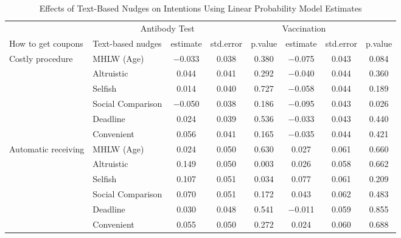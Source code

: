 \begin{table}

\caption{Effects of Text-Based Nudges on Intentions Using Linear Probability Model Estimates \label{tab:int-reg-ftest}}
\centering
\begin{tabular}[t]{>{\raggedright\arraybackslash}p{5em}lcccccc}
\toprule
\multicolumn{2}{c}{ } & \multicolumn{3}{c}{Antibody Test} & \multicolumn{3}{c}{Vaccination} \\
\cmidrule(l{3pt}r{3pt}){3-5} \cmidrule(l{3pt}r{3pt}){6-8}
How to get coupons & Text-based nudges & estimate & std.error & p.value & estimate  & std.error  & p.value \\
\midrule
Costly procedure & MHLW (Age) & \num{-0.033} & \num{0.038} & \num{0.380} & \num{-0.075} & \num{0.043} & \num{0.084}\\
 & Altruistic & \num{0.044} & \num{0.041} & \num{0.292} & \num{-0.040} & \num{0.044} & \num{0.360}\\
 & Selfish & \num{0.014} & \num{0.040} & \num{0.727} & \num{-0.058} & \num{0.044} & \num{0.189}\\
 & Social Comparison & \num{-0.050} & \num{0.038} & \num{0.186} & \num{-0.095} & \num{0.043} & \num{0.026}\\
 & Deadline & \num{0.024} & \num{0.039} & \num{0.536} & \num{-0.033} & \num{0.043} & \num{0.440}\\
 & Convenient & \num{0.056} & \num{0.041} & \num{0.165} & \num{-0.035} & \num{0.044} & \num{0.421}\\
Automatic receiving & MHLW (Age) & \num{0.024} & \num{0.050} & \num{0.630} & \num{0.027} & \num{0.061} & \num{0.660}\\
 & Altruistic & \num{0.149} & \num{0.050} & \num{0.003} & \num{0.026} & \num{0.058} & \num{0.662}\\
 & Selfish & \num{0.107} & \num{0.051} & \num{0.034} & \num{0.077} & \num{0.061} & \num{0.209}\\
 & Social Comparison & \num{0.070} & \num{0.051} & \num{0.172} & \num{0.043} & \num{0.062} & \num{0.483}\\
 & Deadline & \num{0.030} & \num{0.048} & \num{0.541} & \num{-0.011} & \num{0.059} & \num{0.855}\\
 & Convenient & \num{0.055} & \num{0.050} & \num{0.272} & \num{0.024} & \num{0.060} & \num{0.688}\\
\bottomrule
\end{tabular}
\end{table}
